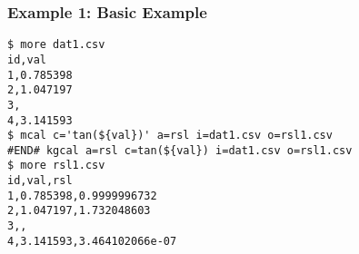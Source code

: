 \subsubsection*{Example 1: Basic Example}



\begin{Verbatim}[baselinestretch=0.7,frame=single]
$ more dat1.csv
id,val
1,0.785398
2,1.047197
3,
4,3.141593
$ mcal c='tan(${val})' a=rsl i=dat1.csv o=rsl1.csv
#END# kgcal a=rsl c=tan(${val}) i=dat1.csv o=rsl1.csv
$ more rsl1.csv
id,val,rsl
1,0.785398,0.9999996732
2,1.047197,1.732048603
3,,
4,3.141593,3.464102066e-07
\end{Verbatim}
